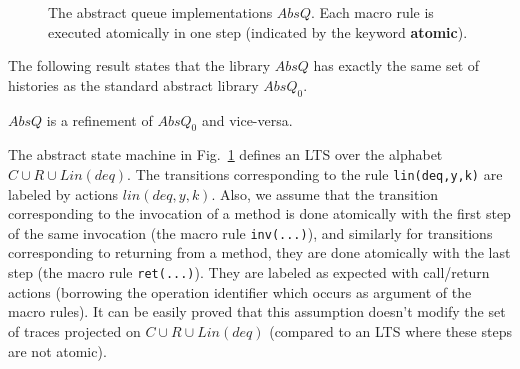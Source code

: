 \begin{figure}[t]
 \vspace{-4mm}
  \caption{The abstract queue implementations $AbsQ$. Each macro rule is executed atomically in one step (indicated by the keyword {\ttfamily \bfseries atomic}).
  }
  \label{fig:transitions:AbsQ}
\vspace{-6mm}
\end{figure}

The following result states that the library $AbsQ$ has exactly the same set of histories as the standard abstract library $AbsQ_0$. %

\vspace{-1.5mm}
\begin{theorem}\label{th:absImplQueue}
$AbsQ$ is a refinement of $AbsQ_0$ and vice-versa.
\vspace{-2mm}
\end{theorem}

The abstract state machine in Fig.~\ref{fig:transitions:AbsQ} defines an LTS over the alphabet $C\cup R\cup Lin(deq)$. The transitions corresponding to the rule {\tt lin(deq,y,k)} are labeled by  actions $lin(deq,y,k)$. Also, we assume that the transition corresponding to the invocation of a method is done atomically with the first step of the same invocation (the macro rule {\tt inv(...)}), and similarly for transitions corresponding to returning from a method, they are done atomically with the last step (the macro rule {\tt ret(...)}). They are labeled as expected with call/return actions (borrowing the operation identifier which occurs as argument of the macro rules). It can be easily proved that this assumption doesn't modify the set of traces projected on $C\cup R\cup Lin(deq)$ (compared to an LTS where these steps are not atomic).

